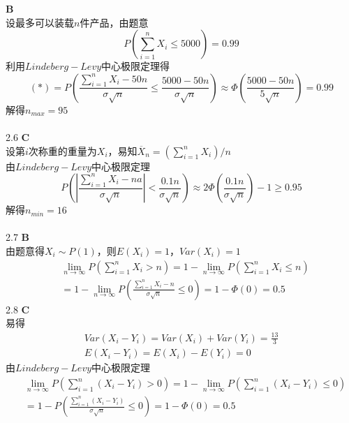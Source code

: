 \documentclass[a4paper]{ctexart}    %
\begin{document}
	 \quad\textbf{B} \\
	设最多可以装载$n$件产品，由题意
	\begin{equation*}
		P\left(\sum\limits_{i=1}^{n} X_i \leq 5000 \right) = 0.99 \tag{$*$}
	\end{equation*}
	利用$Lindeberg-Levy$中心极限定理得
	\begin{equation*}
		(*)=P\left(\frac{\sum\limits_{i=1}^{n}X_i-50n}{\sigma \sqrt{n}} \leq \frac{5000-50n}{\sigma \sqrt{n}}\right)\approx \Phi\left(\frac{5000-50n}{5 \sqrt{n}} \right)=0.99
	\end{equation*}
	解得$n_{max}=95$\\
	\\
	2.6 \quad\textbf{C} \\
	设第$i$次称重的重量为$X_i$，易知$\overline{X}_n=\left(\sum\limits_{i=1}^{n}X_i \right)/ n$\\
	由$Lindeberg-Levy$中心极限定理
	\begin{equation*}
		P\left(\left|\frac{\sum\limits_{i=1}^{n}X_i-na}{\sigma\sqrt{n}}\right| < \frac{0.1 n}{\sigma \sqrt{n}}\right)\approx 2\Phi\left(\frac{0.1n}{\sigma \sqrt{n}}\right)-1 \geq 0.95
	\end{equation*}
	解得$n_{min} = 16$\\
	\\
	2.7 \quad\textbf{B} \\
	由题意得$X_i \sim P(1)$，则$E(X_i)=1$，$Var(X_i)=1$\\
	\begin{equation*}
		\begin{split}
			&\lim\limits_{n \to \infty}P\left(\sum\limits_{i=1}^{n}X_i > n\right)=1-\lim\limits_{n \to \infty}P\left(\sum\limits_{i=1}^{n}X_i \leq n \right)\\
			&=1-\lim\limits_{n \to \infty}P\left(\frac{\sum\limits_{i=1}^{n}X_i-n}{\sigma\sqrt{n}} \leq 0\right)=1-\Phi(0)=0.5
		\end{split}
	\end{equation*}
	2.8 \quad\textbf{C}\\
	易得
	\begin{equation*}
		\begin{split}
			Var(X_i-Y_i)=Var(X_i)+Var(Y_i)=\frac{13}{3}\\
			E(X_i-Y_i)=E(X_i)-E(Y_i)=0
		\end{split}
	\end{equation*}
	由$Lindeberg-Levy$中心极限定理
	\begin{equation*}
		\begin{split}
			&\lim\limits_{n \to \infty} P\left(\sum\limits_{i=1}^{n}(X_i-Y_i) > 0\right)=1-\lim\limits_{n \to \infty} P\left(\sum\limits_{i=1}^{n}(X_i-Y_i) \leq 0\right)\\
			&=1-P\left(\frac{\sum\limits_{i=1}^{n}(X_i-Y_i)}{\sigma \sqrt{n}} \leq 0\right) = 1-\Phi(0) = 0.5
		\end{split}
	\end{equation*}
\end{document}
